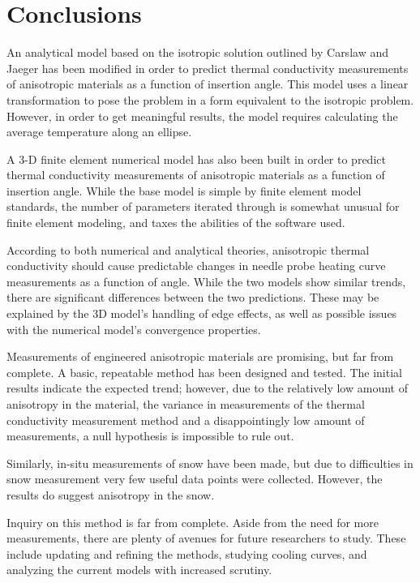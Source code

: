 \chapter{Conclusions}

An analytical model based on the isotropic solution outlined by
Carslaw and Jaeger has been modified in order to predict thermal conductivity
measurements of anisotropic materials as a function of insertion angle.  This
model uses a linear transformation to pose the problem in a form equivalent to
the isotropic problem. However, in order to get meaningful results, the model
requires calculating the average temperature along an ellipse.

A 3-D finite element numerical model has also been built in order to predict
thermal conductivity measurements  of anisotropic materials as a function of
insertion angle. While the base model is simple by finite element model
standards, the number of parameters iterated through is somewhat unusual for
finite element modeling, and taxes the abilities of the software used.

According to both numerical and analytical theories, anisotropic thermal
conductivity should cause predictable changes in needle probe heating curve
measurements as a function of angle. While the two models show similar trends, 
there are significant differences between the two predictions. These
may be explained by the 3D model's handling of edge effects, as well as possible
issues with the numerical model's convergence properties.

Measurements of engineered anisotropic materials are promising, but far from
complete. A basic, repeatable method has been designed and tested. The initial
results indicate the expected trend; however, due to the relatively low
amount of anisotropy in the material, the variance in measurements of the thermal
conductivity measurement method and a disappointingly low amount of
measurements, a null hypothesis is impossible to rule out.

Similarly, in-situ measurements of snow have been made, but due to difficulties
in snow measurement very few useful data points were collected. However, the
results do suggest anisotropy in the snow.

Inquiry on this method is far from complete. Aside from the need
for more measurements, there are plenty of avenues for future researchers to
study. These include updating and refining the methods, studying cooling curves,
and analyzing the current models with increased scrutiny.
